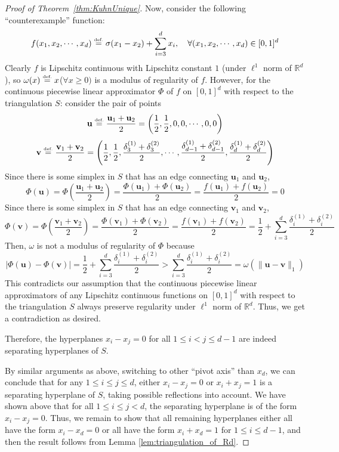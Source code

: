 \documentclass{article}
\numberwithin{equation}{section}
\theoremstyle{definition}
\newcommand{\eqdef}{\ensuremath{\stackrel{\mbox{\upshape\tiny def.}}{=}}}
\begin{document}
\begin{proof}[{Proof of Theorem~\ref{thm:KuhnUnique}}]
Now, consider the following ``counterexample'' function:
$$f(x_1,x_2,\cdots,x_d)  \eqdef  \sigma(x_1 - x_2) 
+ \sum_{i=3}^{d} x_i, \quad
\forall (x_1,x_2,\cdots,x_d)\in [0,1]^d$$
Clearly $f$ is Lipschitz continuous with Lipschitz constant $1$ (under $\ell^1$ norm of $\mathbb{R}^d$), so $\omega(x) \eqdef x$($\forall x\ge 0)$ is a modulus of regularity of $f$. However, for the continuous piecewise linear approximator $\Phi$ of $f$ on $[0,1]^d$ with respect to the triangulation $S$: consider the pair of points 
$$\mathbf{u}  \eqdef  \frac{\mathbf{u}_1 + \mathbf{u}_2}{2} = 
\left( \frac{1}{2},\frac{1}{2},0,0,\cdots,0,0 \right) $$
$$\mathbf{v}  \eqdef  \frac{\mathbf{v}_1 + \mathbf{v}_2}{2} = 
\left( 
    \frac{1}{2},\frac{1}{2},
    \frac{\delta_3^{(1)} + \delta_3^{(2)}}{2},
    \cdots,
    \frac{\delta_{d-1}^{(1)} + \delta_{d-1}^{(2)}} {2}, 
    \frac{\delta_{d}^{(1)}   + \delta_{d}^{(2)}}   {2}
\right)$$
Since there is some simplex in $S$ that has an edge connecting $\mathbf{u}_1$ and $\mathbf{u}_2$, 
$$\Phi ( \mathbf{u} )  
= \Phi \left( \frac{\mathbf{u}_1 + \mathbf{u}_2}{2} \right)  
= \frac{ \Phi(\mathbf{u}_1) + \Phi(\mathbf{u}_2) } {2}   
= \frac{ f(\mathbf{u}_1) + f(\mathbf{u}_2) } {2} 
= 0$$
Since there is some simplex in $S$ that has an edge connecting $\mathbf{v}_1$ and $\mathbf{v}_2$, 
$$\Phi ( \mathbf{v} )  
= \Phi \left( \frac{\mathbf{v}_1 + \mathbf{v}_2}{2} \right)  
= \frac{ \Phi(\mathbf{v}_1) + \Phi(\mathbf{v}_2) } {2}   
= \frac{ f(\mathbf{v}_1) + f(\mathbf{v}_2) } {2} 
= \frac{1}{2} + \sum_{i=3}^d 
  \frac{\delta_i^{(1)}  + \delta_i^{(2)}} {2}$$
Then, $\omega$ is not a modulus of regularity of $\Phi$ because 
$$|\Phi ( \mathbf{u} ) - \Phi ( \mathbf{v} )| 
= \frac{1}{2} + \sum_{i=3}^d 
  \frac{\delta_i^{(1)}  + \delta_i^{(2)}} {2}
> \sum_{i=3}^d 
  \frac{\delta_i^{(1)}  + \delta_i^{(2)}} {2}
= \omega( \| \mathbf{u} - \mathbf{v} \|_1 )$$
This contradicts our assumption that the continuous piecewise linear approximators of any Lipschitz continuous functions on $[0,1]^d$ with respect to the triangulation $S$ always preserve regularity under $\ell^1$ norm of $\mathbb{R}^d$. Thus, we get a contradiction as desired.

Therefore, the hyperplanes $x_i-x_j=0$ for all $1 \le i<j \le d-1$ are indeed separating hyperplanes of $S$.

By similar arguments as above, switching to other ``pivot axis'' than $x_d$, we can conclude that for any $1\le i\le j\le d$, either $x_i-x_j=0$ or $x_i+x_j=1$ is a separating hyperplane of $S$, taking possible reflections into account. We have shown above that for all $1\le i\le j<d$, the separating hyperplane is of the form $x_i-x_j=0$. Thus, we remain to show that all remaining hyperplanes either all have the form $x_i-x_d=0$ or all have the form $x_i+x_d=1$ for $1\le i\le d-1$, and then the result follows from Lemma \ref{lem:triangulation_of_Rd}.


\end{proof}
\end{document}
